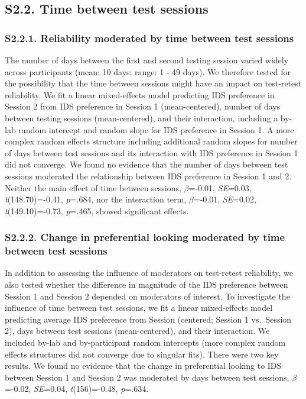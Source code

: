 \documentclass[
  man, donotrepeattitle,floatsintext]{apa6}
\begin{document}
\hypertarget{s2.2.-time-between-test-sessions}{%
\subsection{S2.2. Time between test sessions}\label{s2.2.-time-between-test-sessions}}

\hypertarget{s2.2.1.-reliability-moderated-by-time-between-test-sessions}{%
\subsubsection{S2.2.1. Reliability moderated by time between test sessions}\label{s2.2.1.-reliability-moderated-by-time-between-test-sessions}}

The number of days between the first and second testing session varied widely across participants (mean: 10 days; range: 1 - 49 days). We therefore tested for the possibility that the time between sessions might have an impact on test-retest reliability. We fit a linear mixed-effects model predicting IDS preference in Session 2 from IDS preference in Session 1 (mean-centered), number of days between testing sessions (mean-centered), and their interaction, including a by-lab random intercept and random slope for IDS preference in Session 1.
A more complex random effects structure including additional random slopes for number of days between test sessions and its interaction with IDS preference in Session 1 did not converge.
We found no evidence that the number of days between test sessions moderated the relationship between IDS preference in Session 1 and 2. Neither the main effect of time between sessions, \(\beta\)=-0.01, \emph{SE}=0.03, \emph{t}(148.70)=-0.41, \emph{p}=.684, nor the interaction term, \(\beta\)=-0.01, \emph{SE}=0.02, \emph{t}(149.10)=-0.73, \emph{p}=.465, showed significant effects.

\hypertarget{s2.2.2.-change-in-preferential-looking-moderated-by-time-between-test-sessions}{%
\subsubsection{S2.2.2. Change in preferential looking moderated by time between test sessions}\label{s2.2.2.-change-in-preferential-looking-moderated-by-time-between-test-sessions}}

In addition to assessing the influence of moderators on test-retest reliability, we also tested whether the difference in magnitude of the IDS preference between Session 1 and Session 2 depended on moderators of interest.
To investigate the influence of time between test sessions, we fit a linear mixed-effects model predicting average IDS preference from Session (centered; Session 1 vs.~Session 2), days between test sessions (mean-centered), and their interaction.
We included by-lab and by-participant random intercepts (more complex random effects structures did not converge due to singular fits).
There were two key results.
We found no evidence that the change in preferential looking to IDS between Session 1 and Session 2 was moderated by days between test sessions, \(\beta\)=-0.02, \emph{SE}=0.04, \emph{t}(156)=-0.48, \emph{p}=.634.
\end{document}
